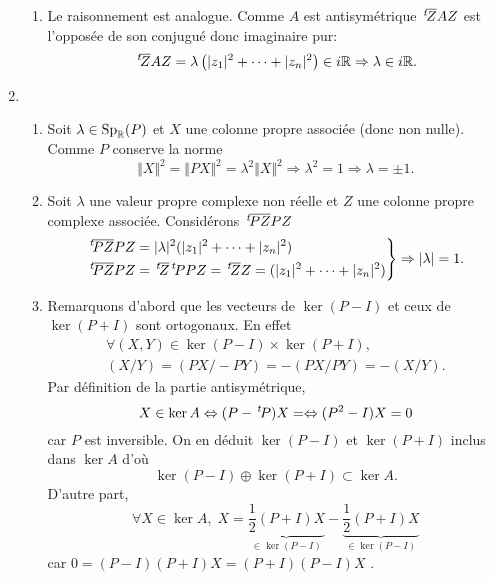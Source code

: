 \begin{enumerate}
\begin{enumerate}
 \item Le raisonnement est analogue. Comme $A$ est antisymétrique $\,\mathstrut^t\!{\overline{Z}} A Z$ est l'opposée de son conjugué donc imaginaire pur: 
\[
 \,\mathstrut^t\!{\overline{Z}} A Z = \lambda \left( |z_1|^2 + \cdots + |z_n|^2\right)\in i\mathbb{R} \Rightarrow \lambda \in i\mathbb{R}.
\]

\end{enumerate}

 \item
 \begin{enumerate}
 \item Soit $\lambda \in \text{Sp}_{\mathbb{R}}(P)$ et $X$ une colonne propre associée (donc non nulle). Comme $P$ conserve la norme 
\[
 \Vert X \Vert^2 = \Vert PX \Vert^2 = \lambda^2 \Vert X \Vert^2 \Rightarrow \lambda^2 = 1 \Rightarrow \lambda = \pm 1.
\]

 \item Soit $\lambda$ une valeur propre complexe non réelle et $Z$ une colonne propre complexe associée. Considérons $\,\mathstrut^t\!{\overline{PZ}} PZ$
\[
 \left. 
 \begin{aligned}
  \,\mathstrut^t\!{\overline{PZ}} PZ &= |\lambda|^2 (|z_1|^2 + \cdots + |z_n|^2)\\
  \,\mathstrut^t\!{\overline{PZ}} PZ &= \,\mathstrut^t\!{\overline{Z}} \,\mathstrut^t\!{P} PZ = \,\mathstrut^t\!{\overline{Z}} Z = (|z_1|^2 + \cdots + |z_n|^2)
 \end{aligned}
\right\rbrace \Rightarrow |\lambda| = 1.
\]

 \item Remarquons d'abord que les vecteurs de $\ker(P-I)$ et ceux de $\ker(P+I)$ sont ortogonaux. En effet
\begin{multline*}
 \forall (X,Y) \in \ker(P-I)\times \ker(P+I),\\
 (X/Y) = (PX/-PY) = - (PX/PY) = -(X/Y).
\end{multline*}
 Par définition de la partie antisymétrique, 
\[
 X \in \ker A \Leftrightarrow (P - \,\mathstrut^t\!{P})X = \Leftrightarrow (P^2 - I)X = 0
\]
car $P$ est inversible. On en déduit $\ker(P-I)$ et $\ker(P+I)$ inclus dans $\ker A$ d'où
\[
 \ker(P-I) \oplus \ker(P+I) \subset \ker A.
\]
D'autre part,
\[
 \forall X \in \ker A,\;
 X = \underset{\in \ker(P-I)}{\underbrace{\frac{1}{2}(P + I)X}} - \underset{\in \ker(P-I)}{\underbrace{\frac{1}{2}(P + I)X}}
\]
car $0 = (P-I)(P+I)X = (P+I)(P-I)X$ .
\end{enumerate}

\end{enumerate}
